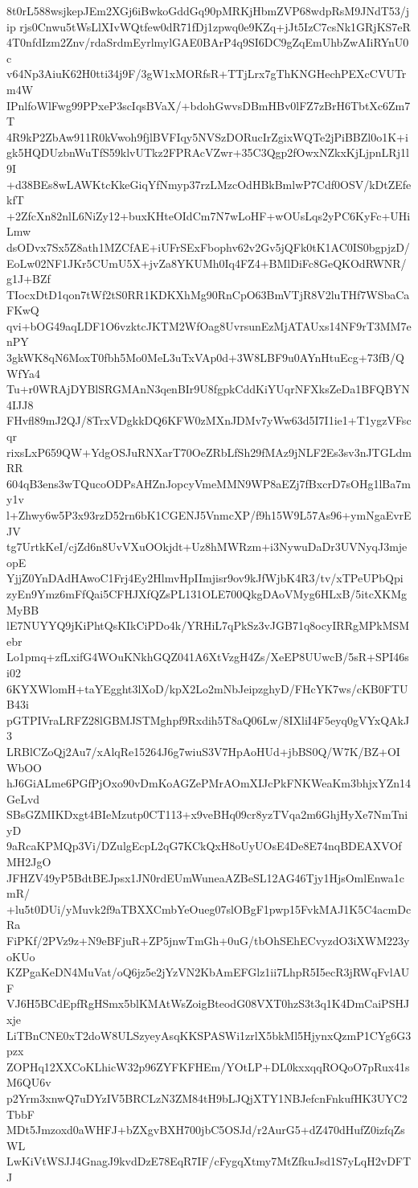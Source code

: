 8t0rL588wsjkepJEm2XGj6iBwkoGddGq90pMRKjHbmZVP68wdpRsM9JNdT53/jip
rjs0Cnwu5tWsLlXIvWQtfew0dR71fDj1zpwq0e9KZq+jJt5IzC7csNk1GRjKS7eR
4T0nfdIzm2Znv/rdaSrdmEyrlmylGAE0BArP4q9SI6DC9gZqEmUhbZwAIiRYnU0c
v64Np3AiuK62H0tti34j9F/3gW1xMORfsR+TTjLrx7gThKNGHechPEXcCVUTrm4W
IPnlfoWlFwg99PPxeP3scIqsBVaX/+bdohGwvsDBmHBv0lFZ7zBrH6TbtXc6Zm7T
4R9kP2ZbAw911R0kVwoh9fjlBVFIqy5NVSzDORucIrZgixWQTe2jPiBBZl0o1K+i
gk5HQDUzbnWuTfS59klvUTkz2FPRAcVZwr+35C3Qgp2fOwxNZkxKjLjpnLRj1l9I
+d38BEs8wLAWKtcKkeGiqYfNmyp37rzLMzcOdHBkBmlwP7Cdf0OSV/kDtZEfekfT
+2ZfcXn82nlL6NiZy12+buxKHteOIdCm7N7wLoHF+wOUsLqs2yPC6KyFc+UHiLmw
dsODvx7Sx5Z8ath1MZCfAE+iUFrSExFbophv62v2Gv5jQFk0tK1AC0IS0bgpjzD/
EoLw02NF1JKr5CUmU5X+jvZa8YKUMh0Iq4FZ4+BMlDiFc8GeQKOdRWNR/g1J+BZf
TIocxDtD1qon7tWf2tS0RR1KDKXhMg90RnCpO63BmVTjR8V2luTHf7WSbaCaFKwQ
qvi+bOG49aqLDF1O6vzktcJKTM2WfOag8UvrsunEzMjATAUxs14NF9rT3MM7enPY
3gkWK8qN6MoxT0fbh5Mo0MeL3uTxVAp0d+3W8LBF9u0AYnHtuEcg+73fB/QWfYa4
Tu+r0WRAjDYBlSRGMAnN3qenBIr9U8fgpkCddKiYUqrNFXksZeDa1BFQBYN4IJJ8
FHvfl89mJ2QJ/8TrxVDgkkDQ6KFW0zMXnJDMv7yWw63d5I7I1ie1+T1ygzVFscqr
rixsLxP659QW+YdgOSJuRNXarT70OeZRbLfSh29fMAz9jNLF2Es3sv3nJTGLdmRR
604qB3ens3wTQucoODPsAHZnJopcyVmeMMN9WP8aEZj7fBxcrD7sOHg1lBa7my1v
l+Zhwy6w5P3x93rzD52rn6bK1CGENJ5VnmcXP/f9h15W9L57As96+ymNgaEvrEJV
tg7UrtkKeI/cjZd6n8UvVXuOOkjdt+Uz8hMWRzm+i3NywuDaDr3UVNyqJ3mjeopE
YjjZ0YnDAdHAwoC1Frj4Ey2HlmvHpIImjisr9ov9kJfWjbK4R3/tv/xTPeUPbQpi
zyEn9Ymz6mFfQai5CFHJXfQZsPL131OLE700QkgDAoVMyg6HLxB/5itcXKMgMyBB
lE7NUYYQ9jKiPhtQsKIkCiPDo4k/YRHiL7qPkSz3vJGB71q8ocyIRRgMPkMSMebr
Lo1pmq+zfLxifG4WOuKNkhGQZ041A6XtVzgH4Zs/XeEP8UUwcB/5sR+SPI46si02
6KYXWlomH+taYEgght3lXoD/kpX2Lo2mNbJeipzghyD/FHcYK7ws/cKB0FTUB43i
pGTPIVraLRFZ28lGBMJSTMghpf9Rxdih5T8aQ06Lw/8IXliI4F5eyq0gVYxQAkJ3
LRBlCZoQj2Au7/xAlqRe15264J6g7wiuS3V7HpAoHUd+jbBS0Q/W7K/BZ+OIWbOO
hJ6GiALme6PGfPjOxo90vDmKoAGZePMrAOmXIJcPkFNKWeaKm3bhjxYZn14GeLvd
SBsGZMIKDxgt4BIeMzutp0CT113+x9veBHq09cr8yzTVqa2m6GhjHyXe7NmTniyD
9aRcaKPMQp3Vi/DZulgEcpL2qG7KCkQxH8oUyUOsE4De8E74nqBDEAXVOfMH2JgO
JFHZV49yP5BdtBEJpsx1JN0rdEUmWuneaAZBeSL12AG46Tjy1HjsOmlEnwa1cmR/
+lu5t0DUi/yMuvk2f9aTBXXCmbYeOueg07slOBgF1pwp15FvkMAJ1K5C4acmDcRa
FiPKf/2PVz9z+N9eBFjuR+ZP5jnwTmGh+0uG/tbOhSEhECvyzdO3iXWM223yoKUo
KZPgaKeDN4MuVat/oQ6jz5e2jYzVN2KbAmEFGlz1ii7LhpR5I5ecR3jRWqFvlAUF
VJ6H5BCdEpfRgHSmx5blKMAtWsZoigBteodG08VXT0hzS3t3q1K4DmCaiPSHJxje
LiTBnCNE0xT2doW8ULSzyeyAsqKKSPASWi1zrlX5bkMl5HjynxQzmP1CYg6G3pzx
ZOPHq12XXCoKLhicW32p96ZYFKFHEm/YOtLP+DL0kxxqqROQoO7pRux41sM6QU6v
p2Yrm3xnwQ7uDYzIV5BRCLzN3ZM84tH9bLJQjXTY1NBJefcnFnkufHK3UYC2TbbF
MDt5Jmzoxd0aWHFJ+bZXgvBXH700jbC5OSJd/r2AurG5+dZ470dHufZ0izfqZsWL
LwKiVtWSJJ4GnagJ9kvdDzE78EqR7IF/cFygqXtmy7MtZfkuJsd1S7yLqH2vDFTJ
